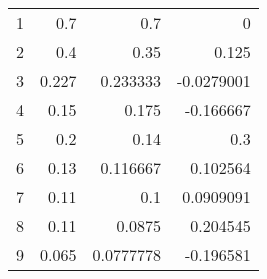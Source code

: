\begin{tabular}{rrrr}
\hline
 1 & 0.7   & 0.7       &  0         \\
 2 & 0.4   & 0.35      &  0.125     \\
 3 & 0.227 & 0.233333  & -0.0279001 \\
 4 & 0.15  & 0.175     & -0.166667  \\
 5 & 0.2   & 0.14      &  0.3       \\
 6 & 0.13  & 0.116667  &  0.102564  \\
 7 & 0.11  & 0.1       &  0.0909091 \\
 8 & 0.11  & 0.0875    &  0.204545  \\
 9 & 0.065 & 0.0777778 & -0.196581  \\
\hline
\end{tabular}